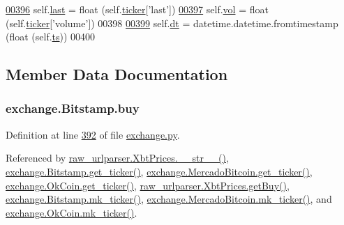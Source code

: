 \begin{DoxyCode}
\hypertarget{classexchange_1_1_bitstamp.tex_l00396}{}\hyperlink{classexchange_1_1_bitstamp_acf669ec9b8b50638dc19dec5fd40ab04}{00396}         self.\hyperlink{classexchange_1_1_bitstamp_acf669ec9b8b50638dc19dec5fd40ab04}{last} = float (self.\hyperlink{classexchange_1_1_exchange_a7cf9e52f993627955a2e242c388daaeb}{ticker}[\textcolor{stringliteral}{'last'}])
\hypertarget{classexchange_1_1_bitstamp.tex_l00397}{}\hyperlink{classexchange_1_1_bitstamp_a4ddf3680f552a7d634b3bbea809cc606}{00397}         self.\hyperlink{classexchange_1_1_bitstamp_a4ddf3680f552a7d634b3bbea809cc606}{vol}  = float (self.\hyperlink{classexchange_1_1_exchange_a7cf9e52f993627955a2e242c388daaeb}{ticker}[\textcolor{stringliteral}{'volume'}])
00398     
\hypertarget{classexchange_1_1_bitstamp.tex_l00399}{}\hyperlink{classexchange_1_1_bitstamp_a527b7d7c5814118b5adfdaf0b960f036}{00399}         self.\hyperlink{classexchange_1_1_bitstamp_a527b7d7c5814118b5adfdaf0b960f036}{dt} = datetime.datetime.fromtimestamp (float (self.\hyperlink{classexchange_1_1_bitstamp_a8e85011dca7c70ffd1ed5ed398b0ed34}{ts}))
00400     
\end{DoxyCode}


\subsection{Member Data Documentation}
\subsubsection[{\texorpdfstring{buy}{buy}}]{\setlength{\rightskip}{0pt plus 5cm}exchange.\+Bitstamp.\+buy}\hypertarget{classexchange_1_1_bitstamp_a40aa1ff3335ef4c80a5107234e05e23e}{}\label{classexchange_1_1_bitstamp_a40aa1ff3335ef4c80a5107234e05e23e}


Definition at line \hyperlink{exchange_8py_source_l00392}{392} of file \hyperlink{exchange_8py_source}{exchange.\+py}.



Referenced by \hyperlink{raw__urlparser_8py_source_l00074}{raw\+\_\+urlparser.\+Xbt\+Prices.\+\_\+\+\_\+str\+\_\+\+\_\+()}, \hyperlink{exchange_8py_source_l00401}{exchange.\+Bitstamp.\+get\+\_\+ticker()}, \hyperlink{exchange_8py_source_l00535}{exchange.\+Mercado\+Bitcoin.\+get\+\_\+ticker()}, \hyperlink{exchange_8py_source_l00600}{exchange.\+Ok\+Coin.\+get\+\_\+ticker()}, \hyperlink{raw__urlparser_8py_source_l00062}{raw\+\_\+urlparser.\+Xbt\+Prices.\+get\+Buy()}, \hyperlink{exchange_8py_source_l00415}{exchange.\+Bitstamp.\+mk\+\_\+ticker()}, \hyperlink{exchange_8py_source_l00549}{exchange.\+Mercado\+Bitcoin.\+mk\+\_\+ticker()}, and \hyperlink{exchange_8py_source_l00614}{exchange.\+Ok\+Coin.\+mk\+\_\+ticker()}.

